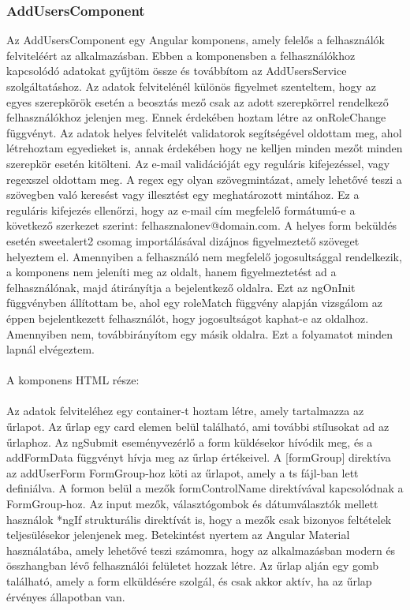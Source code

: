 \subsubsection{AddUsersComponent}

Az AddUsersComponent egy Angular komponens, amely felelős a felhasználók felviteléért az alkalmazásban. Ebben a komponensben a felhasználókhoz kapcsolódó adatokat gyűjtöm össze és továbbítom az AddUsersService szolgáltatáshoz. Az adatok felvitelénél különös figyelmet szenteltem, hogy az egyes szerepkörök esetén a beosztás mező csak az adott szerepkörrel rendelkező felhasználókhoz jelenjen meg. Ennek érdekében hoztam létre az onRoleChange függvényt. Az adatok helyes felvitelét validatorok segítségével oldottam meg, ahol létrehoztam egyedieket is, annak érdekében hogy ne kelljen minden mezőt minden szerepkör esetén kitölteni. Az e-mail validációját egy reguláris kifejezéssel, vagy regexszel oldottam meg. A regex egy olyan szövegmintázat, amely lehetővé teszi a szövegben való keresést vagy illesztést egy meghatározott mintához. Ez a reguláris kifejezés ellenőrzi, hogy az e-mail cím megfelelő formátumú-e a következő szerkezet szerint: felhasznalonev@domain.com. A helyes form beküldés esetén sweetalert2 csomag importálásával dizájnos figyelmeztető szöveget helyeztem el. Amennyiben a felhasználó nem megfelelő jogosultsággal rendelkezik, a komponens nem jeleníti meg az oldalt, hanem figyelmeztetést ad a felhasználónak, majd átirányítja a bejelentkező oldalra. Ezt az ngOnInit függvényben állítottam be, ahol egy roleMatch függvény alapján vizsgálom az éppen bejelentkezett felhasználót, hogy jogosultságot kaphat-e az oldalhoz. Amennyiben nem, továbbirányítom egy másik oldalra. Ezt a folyamatot minden lapnál elvégeztem.\\
\\A komponens HTML része:\\
\\
Az adatok felviteléhez egy container-t hoztam létre, amely tartalmazza az űrlapot. Az űrlap egy card elemen belül található, ami további stílusokat ad az űrlaphoz. Az ngSubmit eseményvezérlő a form küldésekor hívódik meg, és a addFormData függvényt hívja meg az űrlap értékeivel. A [formGroup] direktíva az addUserForm FormGroup-hoz köti az űrlapot, amely a ts fájl-ban lett definiálva. A formon belül a mezők formControlName direktívával kapcsolódnak a FormGroup-hoz. Az input mezők, választógombok és dátumválasztók mellett használok *ngIf strukturális direktívát is, hogy a mezők csak bizonyos feltételek teljesülésekor jelenjenek meg. Betekintést nyertem az Angular Material használatába, amely lehetővé teszi számomra, hogy az alkalmazásban modern és összhangban lévő felhasználói felületet hozzak létre. Az űrlap alján egy gomb található, amely a form elküldésére szolgál, és csak akkor aktív, ha az űrlap érvényes állapotban van. 

